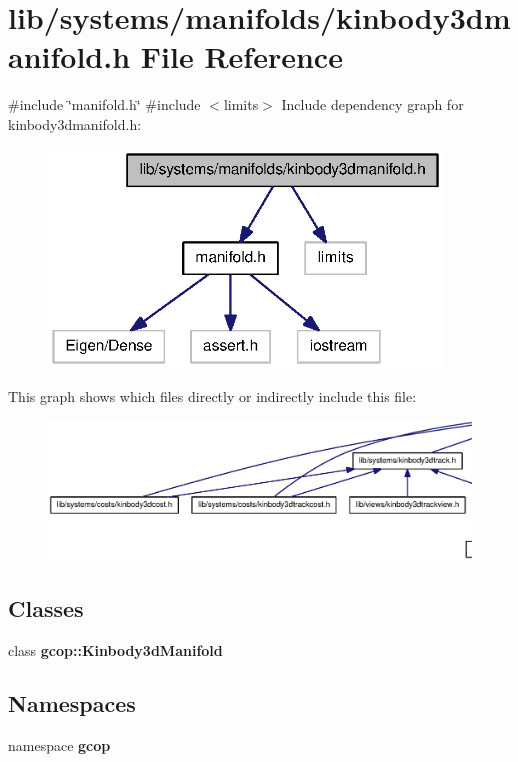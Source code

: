 \section{lib/systems/manifolds/kinbody3dmanifold.h \-File \-Reference}
\label{kinbody3dmanifold_8h}
{\ttfamily \#include \char`\"{}manifold.\-h\char`\"{}}\*
{\ttfamily \#include $<$limits$>$}\*
\-Include dependency graph for kinbody3dmanifold.\-h\-:\nopagebreak
\begin{figure}[H]
\begin{center}
\leavevmode
\includegraphics[width=296pt]{kinbody3dmanifold_8h__incl}
\end{center}
\end{figure}
\-This graph shows which files directly or indirectly include this file\-:
\nopagebreak
\begin{figure}[H]
\begin{center}
\leavevmode
\includegraphics[width=350pt]{kinbody3dmanifold_8h__dep__incl}
\end{center}
\end{figure}
\subsection*{\-Classes}
\begin{DoxyCompactItemize}
\item 
class {\bf gcop\-::\-Kinbody3d\-Manifold}
\end{DoxyCompactItemize}
\subsection*{\-Namespaces}
\begin{DoxyCompactItemize}
\item 
namespace {\bf gcop}
\end{DoxyCompactItemize}
